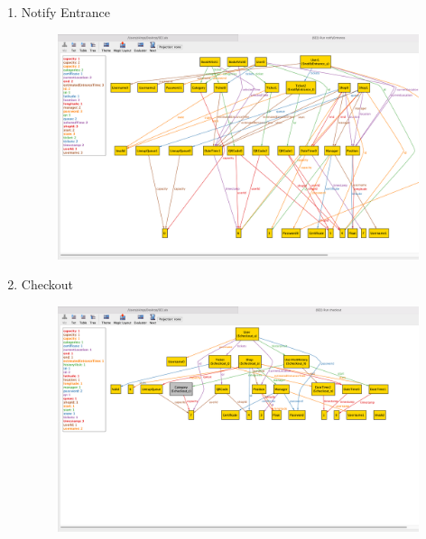 \begin{enumerate}
    \item Notify Entrance \\
    \begin{figure}[H]
      \centering
      \includegraphics[width=0.9\textheight,keepaspectratio, angle=90]{images/alloy_notifyEntrance.png}
    \end{figure}
    \clearpage
    
    \item Checkout \\
    \begin{figure}[H]
      \centering
      \includegraphics[width=0.9\textheight,keepaspectratio, angle=90]{images/alloy_checkout.png}
    \end{figure}
    \clearpage
\end{enumerate}

